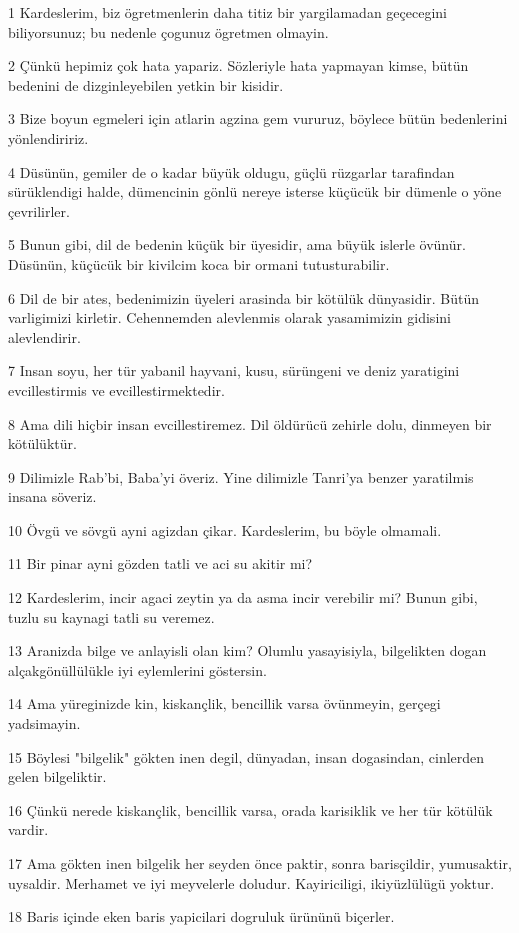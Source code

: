 \par 1 Kardeslerim, biz ögretmenlerin daha titiz bir yargilamadan geçecegini biliyorsunuz; bu nedenle çogunuz ögretmen olmayin.
\par 2 Çünkü hepimiz çok hata yapariz. Sözleriyle hata yapmayan kimse, bütün bedenini de dizginleyebilen yetkin bir kisidir.
\par 3 Bize boyun egmeleri için atlarin agzina gem vururuz, böylece bütün bedenlerini yönlendiririz.
\par 4 Düsünün, gemiler de o kadar büyük oldugu, güçlü rüzgarlar tarafindan sürüklendigi halde, dümencinin gönlü nereye isterse küçücük bir dümenle o yöne çevrilirler.
\par 5 Bunun gibi, dil de bedenin küçük bir üyesidir, ama büyük islerle övünür. Düsünün, küçücük bir kivilcim koca bir ormani tutusturabilir.
\par 6 Dil de bir ates, bedenimizin üyeleri arasinda bir kötülük dünyasidir. Bütün varligimizi kirletir. Cehennemden alevlenmis olarak yasamimizin gidisini alevlendirir.
\par 7 Insan soyu, her tür yabanil hayvani, kusu, sürüngeni ve deniz yaratigini evcillestirmis ve evcillestirmektedir.
\par 8 Ama dili hiçbir insan evcillestiremez. Dil öldürücü zehirle dolu, dinmeyen bir kötülüktür.
\par 9 Dilimizle Rab'bi, Baba'yi överiz. Yine dilimizle Tanri'ya benzer yaratilmis insana söveriz.
\par 10 Övgü ve sövgü ayni agizdan çikar. Kardeslerim, bu böyle olmamali.
\par 11 Bir pinar ayni gözden tatli ve aci su akitir mi?
\par 12 Kardeslerim, incir agaci zeytin ya da asma incir verebilir mi? Bunun gibi, tuzlu su kaynagi tatli su veremez.
\par 13 Aranizda bilge ve anlayisli olan kim? Olumlu yasayisiyla, bilgelikten dogan alçakgönüllülükle iyi eylemlerini göstersin.
\par 14 Ama yüreginizde kin, kiskançlik, bencillik varsa övünmeyin, gerçegi yadsimayin.
\par 15 Böylesi "bilgelik" gökten inen degil, dünyadan, insan dogasindan, cinlerden gelen bilgeliktir.
\par 16 Çünkü nerede kiskançlik, bencillik varsa, orada karisiklik ve her tür kötülük vardir.
\par 17 Ama gökten inen bilgelik her seyden önce paktir, sonra barisçildir, yumusaktir, uysaldir. Merhamet ve iyi meyvelerle doludur. Kayiriciligi, ikiyüzlülügü yoktur.
\par 18 Baris içinde eken baris yapicilari dogruluk ürününü biçerler.

